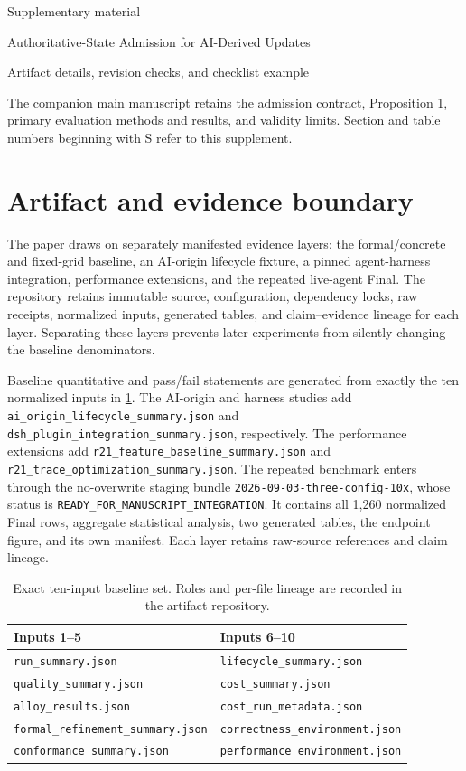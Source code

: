 \documentclass[preprint,12pt,authoryear]{elsarticle}
\newcommand{\code}[1]{\nolinkurl{#1}}
\begin{document}
\begin{center}
{\Large Supplementary material}\par\medskip
Authoritative-State Admission for AI-Derived Updates\par
Artifact details, revision checks, and checklist example
\end{center}
The companion main manuscript retains the admission contract, Proposition 1,
primary evaluation methods and results, and validity limits. Section and table
numbers beginning with S refer to this supplement.
\section{Artifact and evidence boundary}
\label{app:artifact}

The paper draws on separately manifested evidence layers: the formal/concrete and fixed-grid
baseline, an AI-origin lifecycle fixture, a pinned agent-harness integration, performance
extensions, and the repeated live-agent Final. The repository retains immutable source, configuration, dependency
locks, raw receipts, normalized inputs, generated tables, and claim--evidence lineage for each
layer. Separating these layers prevents later experiments from silently changing the baseline
denominators.

Baseline quantitative and pass/fail statements are generated from exactly the ten normalized
inputs in \cref{tab:paper-inputs}. The AI-origin and harness studies add
\code{ai_origin_lifecycle_summary.json} and \code{dsh_plugin_integration_summary.json},
respectively. The performance extensions add
\code{r21_feature_baseline_summary.json} and \code{r21_trace_optimization_summary.json}.
The repeated benchmark enters through the no-overwrite staging bundle
\code{2026-09-03-three-config-10x}, whose status is
\code{READY\_FOR\_MANUSCRIPT\_INTEGRATION}. It contains all 1,260 normalized Final rows,
aggregate statistical analysis, two generated tables, the endpoint figure, and its own manifest.
Each layer retains raw-source references and claim lineage.

\begin{table}[bp]
\centering
\caption{Exact ten-input baseline set. Roles and per-file lineage are recorded in the artifact repository.}
\label{tab:paper-inputs}
\begin{tabularx}{\textwidth}{@{}>{\raggedright\arraybackslash}X>{\raggedright\arraybackslash}X@{}}
\toprule
Inputs 1--5 & Inputs 6--10 \\
\midrule
\code{run_summary.json} & \code{lifecycle_summary.json} \\
\code{quality_summary.json} & \code{cost_summary.json} \\
\code{alloy_results.json} & \code{cost_run_metadata.json} \\
\code{formal_refinement_summary.json} & \code{correctness_environment.json} \\
\code{conformance_summary.json} & \code{performance_environment.json} \\
\bottomrule
\end{tabularx}
\end{table}
\end{document}
